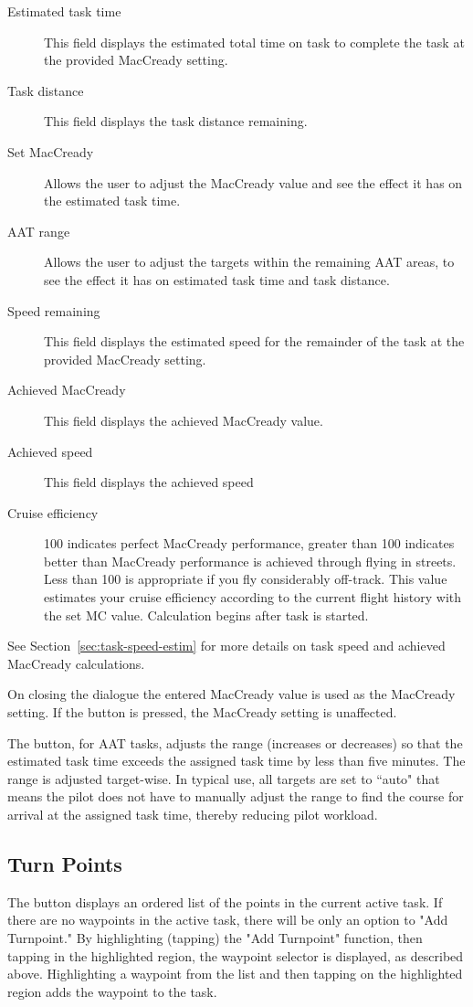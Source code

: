 \begin{description}
\item[Estimated task time]  This field displays the estimated total time 
  on task to complete the task at the provided MacCready setting.
\item[Task distance]  This field displays the task distance remaining.
\item[Set MacCready]  Allows the user to adjust the MacCready value and 
  see the effect it has on the estimated task time.
\item[AAT range]  Allows the user to adjust the targets within the remaining 
  AAT areas, to see the effect it has on estimated task time and task distance.
\item[Speed remaining]  This field displays the estimated speed for the
  remainder of the task at the provided MacCready setting.
\item[Achieved MacCready]  This field displays the achieved MacCready value.
\item[Achieved speed]  This field displays the achieved speed %
\item[Cruise efficiency]  100 indicates perfect MacCready performance, greater 
than 100 indicates better than MacCready performance is achieved through flying
in streets. Less than 100 is appropriate if you fly considerably off-track. This 
value estimates your cruise efficiency according to the current flight history 
with the set MC value. Calculation begins after task is started.
\end{description}
See Section~\ref{sec:task-speed-estim} for more details on task speed
and achieved MacCready calculations.

On closing the dialogue the entered MacCready value is used as the MacCready 
setting. If the  button is pressed, the MacCready setting is 
unaffected.

The  button, for AAT tasks, adjusts the range
(increases or decreases) so that the estimated task time exceeds the
assigned task time by less than five minutes.  The range is adjusted
target-wise. In typical use, all targets are set to ``auto" that means the pilot 
does not have to manually adjust the range to find the course for arrival at 
the assigned task time, thereby reducing pilot workload.

\subsection*{Turn Points}
The  button displays an ordered list of the points in the 
current active task.  If there are no waypoints in the active task, there 
will be only an option to "Add Turnpoint."  By highlighting (tapping) the 
"Add Turnpoint" function, then tapping in the highlighted region, the waypoint 
selector is displayed, as described above.  Highlighting a waypoint from the 
list and then tapping on the highlighted region adds the waypoint to the task.

